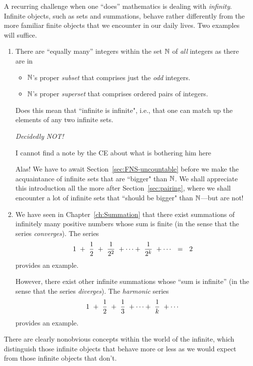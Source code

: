 A recurring challenge when one ``does'' mathematics is dealing with {\em infinity}.  Infinite objects, such as sets and summations, behave rather differently from the more familiar finite objects that we encounter in our daily lives.  Two examples will suffice.  
\begin{enumerate}
\item
There are ``equally many'' integers within the set $\mathbb{N}$ of {\em all} integers as there are in
  \begin{itemize}
  \item
$\mathbb{N}$'s proper {\em subset} that comprises just the {\em odd} integers.
  \medskip\item
$\mathbb{N}$'s proper {\em superset} that comprises ordered pairs of integers.
  \end{itemize}
Does this mean that ``infinite is infinite", i.e., that one can match up the elements of any two infinite sets.
  
\smallskip

\noindent
{\em Decidedly NOT!}

\smallskip

{\Arny I cannot find a note by the CE about what is bothering him here}

\noindent
Alas!  We have to await Section~\ref{sec:FNS-uncountable} before we make the acquaintance of infinite sets that are ``bigger" than $\mathbb{N}$.  We shall appreciate this introduction all the more after Section~\ref{sec:pairing}, where we shall encounter a lot of infinite sets that ``should be bigger" than $\mathbb{N}$---but are not! 


\medskip\item
We have seen in Chapter~\ref{ch:Summation} that there exist summations of infinitely many positive numbers whose sum is finite (in the sense that the series {\em converges}).  The series
\[ 1 \ + \ {1 \over 2} \ + \ {1 \over 2^2} \ + \cdots + \ {1 \over 2^k} \ + \cdots \ \ = \ \ 2 \]
provides an example.

\smallskip

However, there exist other infinite summations whose ``sum is infinite'' (in the sense that the series {\em diverges}).  The {\it harmonic} series
\[ 1 \ + \ {1 \over 2} \ + \ {1 \over 3} \ + \cdots + \ {1 \over k} \ + \cdots \]
provides an example.
\end{enumerate}
There are clearly nonobvious concepts within the world of the infinite, which distinguish those infinite objects that behave more or less as we would expect from those infinite objects that don't.

